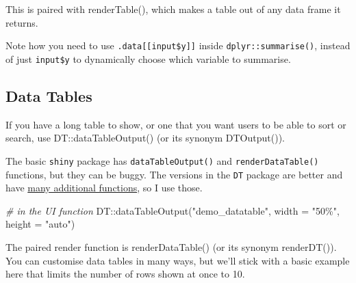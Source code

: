 \documentclass[
]{book}
\newenvironment{Shaded}{\begin{snugshade}}{\end{snugshade}}
\newcommand{\AttributeTok}[1]{\textcolor[rgb]{0.77,0.63,0.00}{#1}}
\newcommand{\CommentTok}[1]{\textcolor[rgb]{0.56,0.35,0.01}{\textit{#1}}}
\newcommand{\FunctionTok}[1]{\textcolor[rgb]{0.00,0.00,0.00}{#1}}
\newcommand{\NormalTok}[1]{#1}
\newcommand{\OtherTok}[1]{\textcolor[rgb]{0.56,0.35,0.01}{#1}}
\newcommand{\SpecialCharTok}[1]{\textcolor[rgb]{0.00,0.00,0.00}{#1}}
\newcommand{\StringTok}[1]{\textcolor[rgb]{0.31,0.60,0.02}{#1}}
\begin{document}
This is paired with renderTable(), which makes a table out of any data frame it returns.

\begin{Shaded}
\end{Shaded}

Note how you need to use \texttt{.data{[}{[}input\$y{]}{]}} inside \texttt{dplyr::summarise()}, instead of just \texttt{input\$y} to dynamically choose which variable to summarise.

\hypertarget{data-tables}{%
\subsection{Data Tables}\label{data-tables}}

If you have a long table to show, or one that you want users to be able to sort or search, use DT::dataTableOutput() (or its synonym DTOutput()).

The basic \texttt{shiny} package has \texttt{dataTableOutput()} and \texttt{renderDataTable()} functions, but they can be buggy. The versions in the \texttt{DT} package are better and have \href{https://rstudio.github.io/DT/}{many additional functions}, so I use those.

\begin{Shaded}
\begin{Highlighting}[]
\CommentTok{\# in the UI function}
\NormalTok{DT}\SpecialCharTok{::}\FunctionTok{dataTableOutput}\NormalTok{(}\StringTok{"demo\_datatable"}\NormalTok{,}
                    \AttributeTok{width =} \StringTok{"50\%"}\NormalTok{,}
                    \AttributeTok{height =} \StringTok{"auto"}\NormalTok{)}
\end{Highlighting}
\end{Shaded}

The paired render function is renderDataTable() (or its synonym renderDT()). You can customise data tables in many ways, but we'll stick with a basic example here that limits the number of rows shown at once to 10.
\end{document}
